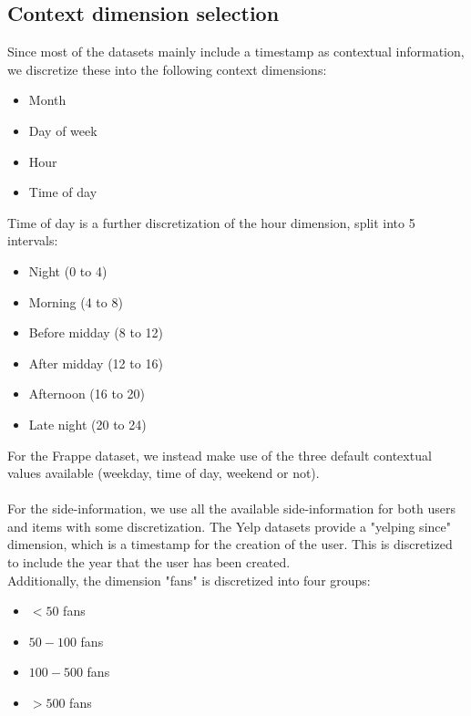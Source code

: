 \subsection{Context dimension selection}
Since most of the datasets mainly include a timestamp as contextual information, we discretize these into the following context dimensions:
\begin{itemize}
	\item Month
	\item Day of week
	\item Hour
	\item Time of day
\end{itemize}
Time of day is a further discretization of the hour dimension, split into 5 intervals:
\begin{itemize}
	\item Night (0 to 4)
	\item Morning (4 to 8)
	\item Before midday (8 to 12)
	\item After midday (12 to 16)
	\item Afternoon (16 to 20)
	\item Late night (20 to 24)
\end{itemize}
For the Frappe dataset, we instead make use of the three default contextual values available (weekday, time of day, weekend or not).
\\\\
For the side-information, we use all the available side-information for both users and items with some discretization.
The Yelp datasets provide a "yelping since" dimension, which is a timestamp for the creation of the user.
This is discretized to include the year that the user has been created.
\\
Additionally, the dimension "fans" is discretized into four groups:
\begin{itemize}
	\item $< 50$ fans
	\item $50 - 100$ fans
	\item $100-500$ fans
	\item $> 500$ fans
\end{itemize}



